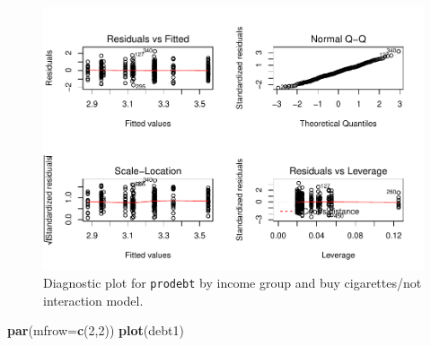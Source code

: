 \documentclass[]{book}
\newenvironment{Shaded}{\begin{snugshade}}{\end{snugshade}}
\newcommand{\KeywordTok}[1]{\textcolor[rgb]{0.13,0.29,0.53}{\textbf{#1}}}
\newcommand{\DataTypeTok}[1]{\textcolor[rgb]{0.13,0.29,0.53}{#1}}
\newcommand{\DecValTok}[1]{\textcolor[rgb]{0.00,0.00,0.81}{#1}}
\newcommand{\NormalTok}[1]{#1}
\theoremstyle{definition}
\theoremstyle{definition}
\theoremstyle{remark}
\begin{document}
\begin{figure}
\centering
\includegraphics{04-twoWayAnova_files/figure-latex/Figure4-13-1.pdf}
\caption{\label{fig:Figure4-13}Diagnostic plot for \texttt{prodebt} by income group and
buy cigarettes/not interaction model.}
\end{figure}

\begin{Shaded}
\begin{Highlighting}[]
\KeywordTok{par}\NormalTok{(}\DataTypeTok{mfrow=}\KeywordTok{c}\NormalTok{(}\DecValTok{2}\NormalTok{,}\DecValTok{2}\NormalTok{))}
\KeywordTok{plot}\NormalTok{(debt1)}
\end{Highlighting}
\end{Shaded}
\end{document}
